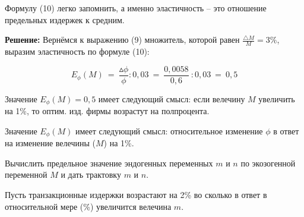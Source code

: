 \documentclass[12pt,a4paper]{article}
\begin{document}
Формулу (10) легко запомнить, а именно эластичность -- это отношение предельных издержек к средним.

\textbf{Решение:} Вернёмся к выражению (9) множитель, которой равен $\displaystyle{\frac{\triangle M}{M} = 3\%}$, выразим эластичность по формуле (10):

\begin{equation*}
E_{\phi }( M) \ =\ \frac{\vartriangle \phi }{\phi } :0,03\ =\ \frac{0,0058}{0,6} \ :0,03\ =\ 0,5
\end{equation*}

Значение $E_{\phi}(M) = 0,5$ имеет следующий смысл: если велечину $M$ увеличить на 1\%, то оптим. изд. фирмы возрастут на полпроцента.

Значение $E_{\phi}(M)$ имеет следующий смысл: относительное изменение $\phi$ в ответ на изменение велечины ($M$) на 1\%. 


 Вычислить предельное значение эндогенных переменных $m$ и $n$ по экозогенной переменной $M$ и дать трактовку $m$ и $n$. 

Пусть транзакционные издержки возрастают на 2\% во сколько в ответ в относительной мере (\%) увеличится велечина $m$.
\end{document}
